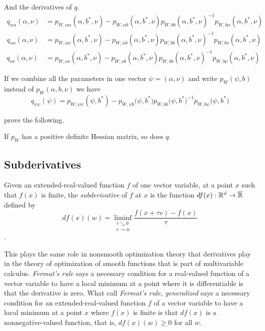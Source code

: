 And the derivatives of $q$.
\begin{align*}
   q_{\alpha \alpha}(\alpha, \nu)
   & =
   p_{W, \alpha \alpha}(\alpha, b^*, \nu)
   -
   p_{W, \alpha b}(\alpha, b^*, \nu)
   p_{W, b b}(\alpha, b^*, \nu)^{-1} p_{W, b \alpha}(\alpha, b^*, \nu)
   \\
   q_{\alpha \nu}(\alpha, \nu)
   & =
   p_{W, \alpha \nu}(\alpha, b^*, \nu)
   -
   p_{W, \alpha b}(\alpha, b^*, \nu)
   p_{W, b b}(\alpha, b^*, \nu)^{-1} p_{W, b \nu}(\alpha, b^*, \nu)
   \\
   q_{\nu \nu}(\alpha, \nu)
   & =
   p_{W, \nu \nu}(\alpha, b^*, \nu)
   -
   p_{W, \nu b}(\alpha, b^*, \nu)
   p_{W, b b}(\alpha, b^*, \nu)^{-1} p_{W, b \nu}(\alpha, b^*, \nu)
\end{align*}

If we combine all the parameters
in one vector $\psi = (\alpha, \nu)$ and write $p_W(\psi, b)$ instead
of $p_W(\alpha, b, \nu)$ we have
\begin{equation} \label{eq:psi-psi}
   q_{\psi \psi}(\psi)
   =
   p_{W, \psi \psi}(\psi, b^*)
   -
   p_{W, \psi b}\bigl(\psi, b^*\bigr)
   p_{W, b b}\bigl(\psi, b^*\bigr)^{- 1}
   p_{W, b \psi}\bigl(\psi, b^*\bigr)
\end{equation}

\citet[Section~1.8]{reaster-tr} prove the following.
\begin{theorem} \label{th:positive-definite}
If $p_W$ has a positive definite Hessian matrix, so does $q$.
\end{theorem}

\subsection{Subderivatives}

Given an extended-real-valued function $f$ of one vector variable,
at a point $x$ such that $f(x)$ is finite,
the \emph{subderivative} of $f$ at $x$ is
the function $d f(x) : \mathbb{R}^d \to \overline{\mathbb{R}}$ defined by
\begin{equation} \label{eq:subderivative}
   d f(x)(w) = \liminf_{\substack{\tau \searrow 0 \\ v \to w}}
   \frac{f(x + \tau v) - f(x)}{\tau}
\end{equation}
\citep[Definition~8.1]{rockafellar-wets}.

This plays the same role in nonsmooth optimization theory
that derivatives play in the theory of optimization of smooth functions that
is part of multivariable calculus.  \emph{Fermat's rule} says a necessary
condition for a real-valued function of a vector variable to have
a local minimum at a point where it is differentiable is that
the derivative is zero.  What \citet[Theorem~10.1]{rockafellar-wets} call
\emph{Fermat's rule, generalized} says a necessary condition for
an extended-real-valued function $f$ of a vector variable to have
a local minimum at a point $x$ where $f(x)$ is finite is that $d f(x)$ is
a nonnegative-valued function, that is, $d f(x)(w) \ge 0$ for all $w$.

